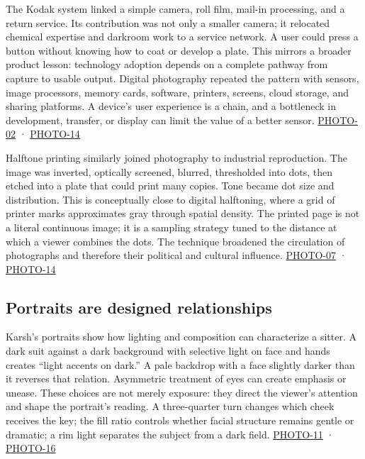 The Kodak system linked a simple camera, roll film, mail-in processing, and a return service. Its contribution was not only a smaller camera; it relocated chemical expertise and darkroom work to a service network. A user could press a button without knowing how to coat or develop a plate. This mirrors a broader product lesson: technology adoption depends on a complete pathway from capture to usable output. Digital photography repeated the pattern with sensors, image processors, memory cards, software, printers, screens, cloud storage, and sharing platforms. A device's user experience is a chain, and a bottleneck in development, transfer, or display can limit the value of a better sensor. \hyperref[04-visual-computing-ii-ch036-photo-02---photography-session-02]{PHOTO-02} · \hyperref[04-visual-computing-ii-ch036-photo-14---photography-session-14]{PHOTO-14}

Halftone printing similarly joined photography to industrial reproduction. The image was inverted, optically screened, blurred, thresholded into dots, then etched into a plate that could print many copies. Tone became dot size and distribution. This is conceptually close to digital halftoning, where a grid of printer marks approximates gray through spatial density. The printed page is not a literal continuous image; it is a sampling strategy tuned to the distance at which a viewer combines the dots. The technique broadened the circulation of photographs and therefore their political and cultural influence. \hyperref[04-visual-computing-ii-ch036-photo-07---photography-session-07]{PHOTO-07} · \hyperref[04-visual-computing-ii-ch036-photo-14---photography-session-14]{PHOTO-14}

\subsection{Portraits are designed relationships}\label{04-visual-computing-ii-ch034-portraits-are-designed-relationships}

\hypertarget{04-visual-computing-ii-ch034-portraits-are-designed-relationships}{}

Karsh's portraits show how lighting and composition can characterize a sitter. A dark suit against a dark background with selective light on face and hands creates ``light accents on dark.'' A pale backdrop with a face slightly darker than it reverses that relation. Asymmetric treatment of eyes can create emphasis or unease. These choices are not merely exposure: they direct the viewer's attention and shape the portrait's reading. A three-quarter turn changes which cheek receives the key; the fill ratio controls whether facial structure remains gentle or dramatic; a rim light separates the subject from a dark field. \hyperref[04-visual-computing-ii-ch036-photo-11---photography-session-11]{PHOTO-11} · \hyperref[04-visual-computing-ii-ch036-photo-16---photography-session-16]{PHOTO-16}

